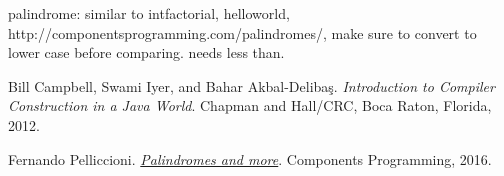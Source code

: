 \documentclass[11pt]{article}
\begin{document}
palindrome: similar to intfactorial, helloworld, http://componentsprogramming.com/palindromes/, make sure to convert to lower case before comparing. needs less than.

\begin{thebibliography}{9}
	Bill Campbell, Swami Iyer, and Bahar Akbal-Deliba\c s.
	\textit{Introduction to Compiler Construction in a Java World}.
	Chapman and Hall/CRC, Boca Raton, Florida, 2012.
	
	Fernando Pelliccioni.
	\href{http://componentsprogramming.com/palindromes/}{\textit{Palindromes and more}}.
	Components Programming, 2016.
\end{thebibliography}
\end{document}
